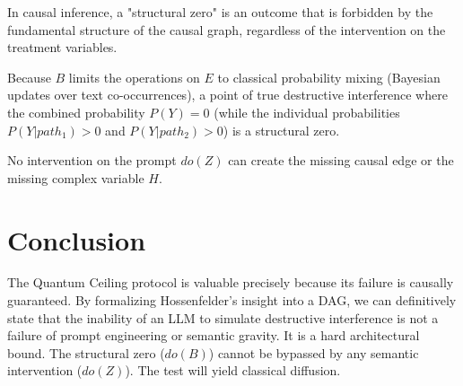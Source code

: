 \documentclass[12pt,a4paper]{article}
\begin{document}
In causal inference, a "structural zero" is an outcome that is forbidden by the fundamental structure of the causal graph, regardless of the intervention on the treatment variables.

Because $B$ limits the operations on $E$ to classical probability mixing (Bayesian updates over text co-occurrences), a point of true destructive interference where the combined probability $P(Y) = 0$ (while the individual probabilities $P(Y|path_1) > 0$ and $P(Y|path_2) > 0$) is a structural zero.

No intervention on the prompt $do(Z)$ can create the missing causal edge or the missing complex variable $H$.

\section{Conclusion}

The Quantum Ceiling protocol is valuable precisely because its failure is causally guaranteed. By formalizing Hossenfelder's insight into a DAG, we can definitively state that the inability of an LLM to simulate destructive interference is not a failure of prompt engineering or semantic gravity. It is a hard architectural bound. The structural zero ($do(B)$) cannot be bypassed by any semantic intervention ($do(Z)$). The test will yield classical diffusion.
\end{document}
